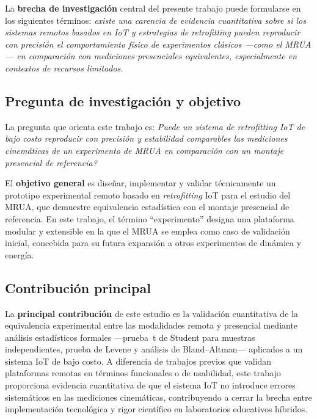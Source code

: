\documentclass{espol-rte}
\begin{document}
La \textbf{brecha de investigaci\'on} central del presente trabajo puede formularse en los siguientes t\'erminos: \textit{existe una carencia de evidencia cuantitativa sobre si los sistemas remotos basados en IoT y estrategias de \textit{retrofitting} pueden reproducir con precisi\'on el comportamiento f\'isico de experimentos cl\'asicos ---como el MRUA--- en comparaci\'on con mediciones presenciales equivalentes, especialmente en contextos de recursos limitados.}

\subsection{Pregunta de investigaci\'on y objetivo}

La pregunta que orienta este trabajo es: \textit{\textquestiondown{}Puede un sistema de \textit{retrofitting} IoT de bajo costo reproducir con precisi\'on y estabilidad comparables las mediciones cinem\'aticas de un experimento de MRUA en comparaci\'on con un montaje presencial de referencia?}

El \textbf{objetivo general} es dise\~nar, implementar y validar t\'ecnicamente un prototipo experimental remoto basado en \textit{retrofitting} IoT para el estudio del MRUA, que demuestre equivalencia estadística con el montaje presencial de referencia. En este trabajo, el t\'ermino ``experimento'' designa una plataforma modular y extensible en la que el MRUA se emplea como caso de validaci\'on inicial, concebida para su futura expansi\'on a otros experimentos de din\'amica y energ\'ia.

\subsection{Contribuci\'on principal}

La \textbf{principal contribuci\'on} de este estudio es la validaci\'on cuantitativa de la equivalencia experimental entre las modalidades remota y presencial mediante an\'alisis estad\'isticos formales ---prueba~t de Student para muestras independientes, prueba de Levene y an\'alisis de Bland--Altman--- aplicados a un sistema IoT de bajo costo. A diferencia de trabajos previos que validan plataformas remotas en t\'erminos funcionales o de usabilidad, este trabajo proporciona evidencia cuantitativa de que el sistema IoT no introduce errores sistem\'aticos en las mediciones cinem\'aticas, contribuyendo a cerrar la brecha entre implementaci\'on tecnol\'ogica y rigor cient\'ifico en laboratorios educativos h\'ibridos.
\end{document}
